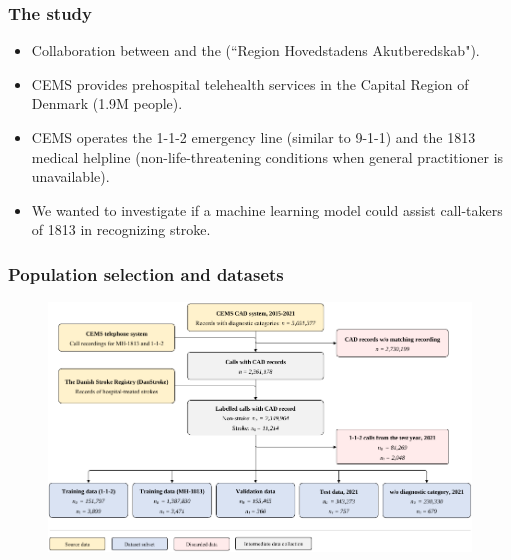 \begin{frame}
    \frametitle{The study}
    \begin{itemize}
        \item Collaboration between  and the  (``Region Hovedstadens Akutberedskab").
        \item CEMS provides prehospital telehealth services in the Capital Region of Denmark (1.9M people).
        \item CEMS operates the 1-1-2 emergency line (similar to 9-1-1) and the 1813 medical helpline (non-life-threatening conditions when general practitioner is unavailable).
        \vspace{1em}
        \item We wanted to investigate if a machine learning model could assist call-takers of 1813 in recognizing stroke.
    \end{itemize}
\end{frame}


\begin{frame}
    \frametitle{Population selection and datasets}
    \begin{figure}
        \centering
        \includegraphics[width=0.65\paperwidth]{../graphics/paper_retrospective/data_flowchart.pdf}
    \end{figure}

\end{frame}



